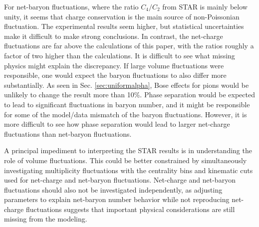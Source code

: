 For net-baryon fluctuations, where the ratio $C_4/C_2$ from STAR is mainly below unity, it seems that charge conservation is the main source of non-Poissonian fluctuation. The experimental results seem higher, but statistical uncertainties make it difficult to make strong conclusions. In contrast, the net-charge fluctuations are far above the calculations of this paper, with the ratios roughly a factor of two higher than the calculations. It is difficult to see what missing physics might explain the discrepancy. If large volume fluctuations were responsible, one would expect the baryon fluctuations to also differ more substantially. As seen in Sec. \ref{sec:uniformalpha}, Bose effects for pions would be unlikely to change the result more than 10\%. Phase separation would be expected to lead to significant fluctuations in baryon number, and it might be responsible for some of the model/data mismatch of the baryon fluctuations. However, it is more difficult to see how phase separation would lead to larger net-charge fluctuations than net-baryon fluctuations.

A principal impediment to interpreting the STAR results is in understanding the role of volume fluctuations. This could be better constrained by simultaneously investigating multiplicity fluctuations with the centrality bins and kinematic cuts used for net-charge and net-baryon fluctuations. Net-charge and net-baryon fluctuations should also not be investigated independently, as adjusting parameters to explain net-baryon number behavior while not reproducing net-charge fluctuations suggests that important physical considerations are still missing from the modeling. 








